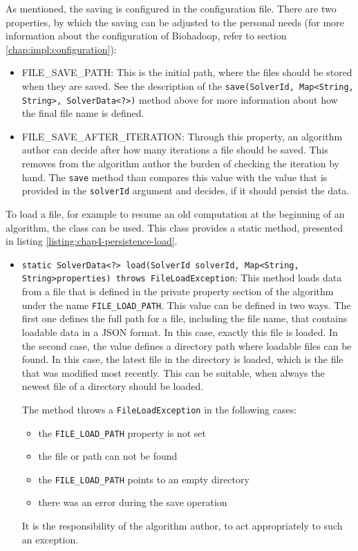   As mentioned, the saving is configured in the configuration file. There are two properties, by which the saving can be adjusted to the personal needs (for more information about the configuration of Biohadoop, refer to section \ref{chap:impl:configuration}):
  \begin{itemize}
    \item FILE\_SAVE\_PATH: This is the initial path, where the files should be stored when they are saved. See the description of the \texttt{save(SolverId, Map<String, String>, SolverData<?>)} method above for more information about how the final file name is defined.
    \item FILE\_SAVE\_AFTER\_ITERATION: Through this property, an algorithm author can decide after how many iterations a file should be saved. This removes from the algorithm author the burden of checking the iteration by hand. The \texttt{save} method than compares this value with the value that is provided in the \texttt{solverId} argument and decides, if it should persist the data.
  \end{itemize}
  
  To load a file, for example to resume an old computation at the beginning of an algorithm, the class  can be used. This class provides a static method, presented in listing \ref{listing:chap4-persistence-load}.
  
  
  
  \begin{itemize}
    \item \texttt{static SolverData<?> load(SolverId solverId, Map<String, String>\newline properties) throws FileLoadException}: This method loads data from a file that is defined in the private property section of the algorithm under the name \texttt{FILE\_LOAD\_PATH}. This value can be defined in two ways. The first one defines the full path for a file, including the file name, that contains loadable data in a JSON format. In this case, exactly this file is loaded. In the second case, the value defines a directory path where loadable files can be found. In this case, the latest file in the directory is loaded, which is the file that was modified most recently. This can be suitable, when always the newest file of a directory should be loaded.
    
    The method throws a \texttt{FileLoadException} in the following cases:
    \begin{itemize}
      \item the \texttt{FILE\_LOAD\_PATH} property is not set
      \item the file or path can not be found
      \item the \texttt{FILE\_LOAD\_PATH} points to an empty directory
      \item there was an error during the save operation
    \end{itemize}
    It is the responsibility of the algorithm author, to act appropriately to such an exception.
  \end{itemize}

